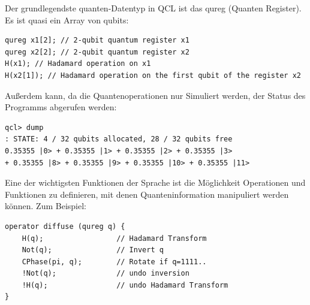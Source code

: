 Der grundlegendste quanten-Datentyp in QCL ist das qureg (Quanten Register).
Es ist quasi ein Array von qubits: \cite{quantenprogwiki}

\begin{lstlisting}
qureg x1[2]; // 2-qubit quantum register x1
qureg x2[2]; // 2-qubit quantum register x2
H(x1); // Hadamard operation on x1
H(x2[1]); // Hadamard operation on the first qubit of the register x2
\end{lstlisting}

\newpage

Außerdem kann, da die Quantenoperationen nur Simuliert werden, der Status des Programms abgerufen werden: \cite{quantenprogwiki}

\begin{lstlisting}
qcl> dump
: STATE: 4 / 32 qubits allocated, 28 / 32 qubits free
0.35355 |0> + 0.35355 |1> + 0.35355 |2> + 0.35355 |3>
+ 0.35355 |8> + 0.35355 |9> + 0.35355 |10> + 0.35355 |11>
\end{lstlisting}

Eine der wichtigsten Funktionen der Sprache ist die Möglichkeit Operationen und Funktionen zu definieren, mit denen Quanteninformation manipuliert werden können.
Zum Beispiel: \cite{quantenprogwiki}

\begin{lstlisting}
operator diffuse (qureg q) {
    H(q);                 // Hadamard Transform
    Not(q);               // Invert q
    CPhase(pi, q);        // Rotate if q=1111..
    !Not(q);              // undo inversion
    !H(q);                // undo Hadamard Transform
}
\end{lstlisting}
